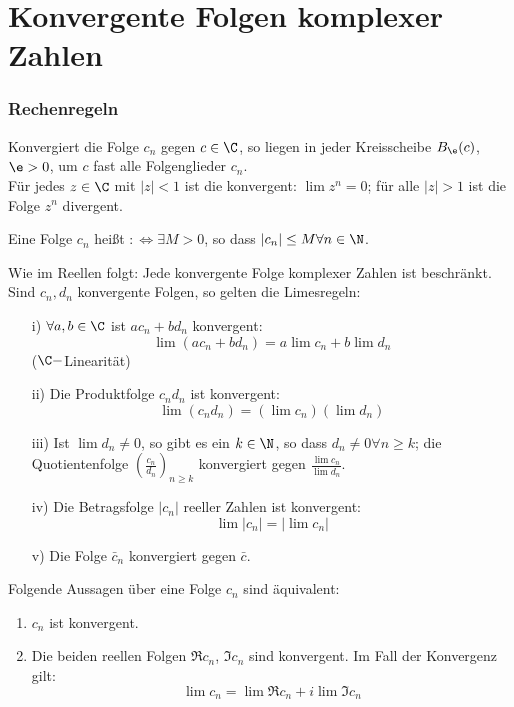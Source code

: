 \chapter{Konvergente Folgen komplexer Zahlen}
\subsection*{Rechenregeln}
Konvergiert die Folge $ c_n $ gegen $ c\in\C $, so liegen in jeder Kreisscheibe $ B_\e(c) $, $ \e>0 $, um $ c $ fast alle Folgenglieder $ c_n $.\\ F\"ur jedes $ z\in\C $ mit $ |z|<1 $ ist die  konvergent: $ \lim z^n=0 $; f\"ur alle $ |z|>1 $ ist die Folge $ z^n $ divergent.\\
\begin{definition}
Eine Folge $ c_n $ hei\ss t $ :\Leftrightarrow\exists M>0 $, so dass $ |c_n|\leq M\forall n\in\N $.\\
\end{definition}
Wie im Reellen folgt:
Jede konvergente Folge komplexer Zahlen ist beschr\"ankt. Sind $ c_n,d_n $ konvergente Folgen, so gelten die Limesregeln:
\begin{enumerate}
\item[i)] $ \forall a,b\in\C $ ist $ ac_n+bd_n $ konvergent:
\[ \lim(ac_n+bd_n)=a\lim c_n+b\lim d_n \]
($ \C- $Linearit\"at)
\item[ii)] Die Produktfolge $ c_nd_n $ ist konvergent:
\[ \lim(c_nd_n)=(\lim c_n)(\lim d_n) \] 
\item[iii)] Ist $ \lim d_n\neq 0 $, so gibt es ein $ k\in\N $, so dass $ d_n\neq 0\forall n\geq k $; die Quotientenfolge $ \left(\frac{c_n}{d_n}\right)_{n\geq k} $ konvergiert gegen $ \frac{\lim c_n}{\lim d_n} $.
\item[iv)] Die Betragsfolge $ |c_n| $ reeller Zahlen ist konvergent:
\[ \lim |c_n|=|\lim c_n| \]
\item[v)] Die Folge $ \bar c_n $ konvergiert gegen $ \bar c $.
\end{enumerate}
\begin{satz}
Folgende Aussagen \"uber eine Folge $ c_n $ sind \"aquivalent:
\begin{enumerate}
\item $ c_n $ ist konvergent.
\item Die beiden reellen Folgen $ \Re c_n $, $ \Im c_n $ sind konvergent.
Im Fall der Konvergenz gilt:
\[ \lim c_n=\lim\Re c_n+i\lim\Im c_n \]
\end{enumerate}
\end{satz}
